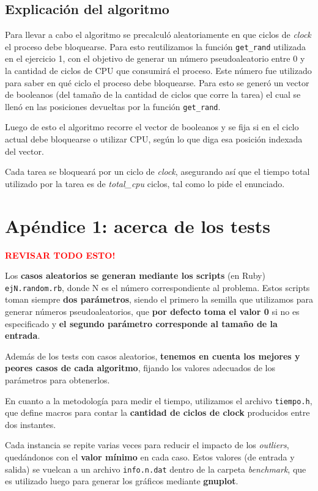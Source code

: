 \documentclass[a4paper]{article}
\begin{document}
\subsection{Explicación del algoritmo}
Para llevar a cabo el algoritmo se precalculó aleatoriamente en que ciclos
de \textit{clock} el proceso debe bloquearse. Para esto reutilizamos la
función \verb|get_rand| utilizada en el ejercicio 1, con el objetivo de
generar un número pseudoaleatorio entre 0 y la cantidad de ciclos de CPU que
consumirá el proceso. Este número fue utilizado para saber en qué ciclo el
proceso debe bloquearse. Para esto se generó un vector de booleanos (del
tamaño de la cantidad de ciclos que corre la tarea) el cual se llenó en las
posiciones devueltas por la función \verb|get_rand|.

Luego de esto el algoritmo recorre el vector de booleanos y se fija si en
el ciclo actual debe bloquearse o utilizar CPU, según lo que diga esa
posición indexada del vector. 

Cada tarea se bloqueará por un ciclo de \textit{clock}, asegurando así que
el tiempo total utilizado por la tarea es de \textit{total\_cpu} ciclos,
tal como lo pide el enunciado.


\newpage

\section{Apéndice 1: acerca de los tests}


\textcolor{red}{\textbf{REVISAR TODO ESTO!}} \medskip

Los \textbf{casos aleatorios se generan mediante los scripts} (en Ruby) \verb|ejN.random.rb|, donde
N es el número correspondiente al problema. Estos scripts toman siempre \textbf{dos parámetros},
siendo el primero la semilla que utilizamos para generar números pseudoaleatorios, que
\textbf{por defecto toma el valor 0} si no es especificado y \textbf{el segundo parámetro corresponde
al tamaño de la entrada}.

Además de los tests con casos aleatorios, \textbf{tenemos en cuenta los mejores y peores
casos de cada algoritmo}, fijando los valores adecuados de los parámetros para
obtenerlos. \medskip

En cuanto a la metodología para medir el tiempo, utilizamos el archivo \verb|tiempo.h|,
que define macros para contar la \textbf{cantidad de ciclos de clock} producidos entre dos instantes. \medskip

Cada instancia se repite varias veces para reducir el impacto de los \textit{outliers}, quedándonos
con el \textbf{valor mínimo} en cada caso. Estos valores (de entrada y salida) se vuelcan a un archivo
\verb|info.n.dat| dentro de la carpeta \textit{benchmark}, que es utilizado luego para generar los gráficos
mediante \textbf{gnuplot}. \medskip
\end{document}
